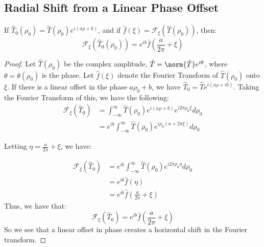 \documentclass[crop=false,class=book,oneside]{standalone}
\begin{document}
        \subsection{Radial Shift from a Linear Phase Offset}
            \begin{theorem}
                If $\hat{T}_0(\rho_0)=\hat{T}(\rho_0)e^{i(a\rho+b)}$,
                and if
                $\hat{f}(\xi)=\mathcal{F}_{\xi}(\hat{T}(\rho_0))$,
                then:
                \begin{equation}
                    \mathcal{F}_{\xi}(\hat{T}_{0}(\rho_0))
                    =e^{ib}\hat{f}(\frac{a}{2\pi}+\xi)
                \end{equation}
            \end{theorem}
            \begin{proof}
                Let $\hat{T}(\rho_0)$ be the complex amplitude,
                $\hat{T}=\norm{\hat{T}}e^{i\theta}$, where
                $\theta=\theta(\rho_0)$ is the phase. Let
                $\hat{f}(\xi)$ denote the Fourier Transform
                of $\hat{T}(\rho_0)$ onto $\xi$. If there is a
                linear offset in the phase $a\rho_0+b$, we have
                $\hat{T}_{0}=\hat{T}e^{i(a\rho+ib)}$. Taking the
                Fourier Transform of this, we have the following:
            \begin{align*}
                \mathcal{F}_{\xi}(\hat{T}_{0})
                &=\int_{-\infty}^{\infty}\hat{T}(\rho_0)
                e^{i(a\rho+b)}e^{i2\pi \rho_0 \xi}d\rho_0\\
            &=e^{ib} \int_{-\infty}^{\infty} \hat{T}(\rho_0)e^{i\rho_0(a+2\pi \xi)}d\rho_0
            \end{align*}
            
            Letting $\eta = \frac{a}{2\pi}+\xi$, we have:
            
            \begin{align*}
            \nonumber \mathcal{F}_{\xi} (\hat{T}_{0}) &= e^{ib}\int_{-\infty}^{\infty}\hat{T}(\rho_0)e^{i2\pi\rho_{0}\eta}d\rho_0 \\
            \nonumber &= e^{ib}\hat{f}(\eta)\\
            		 &= e^{ib}\hat{f}(\frac{a}{2\pi}+\xi)
            \end{align*}
            Thus, we have that:
            \begin{equation*}
            \mathcal{F}_{\xi} (\hat{T}_{0}) = e^{ib}\hat{f}(\frac{a}{2\pi}+\xi)
            \end{equation*}
            So we see that a linear offset in phase creates a horizontal shift in the Fourier transform.
            \end{proof}
\end{document}
